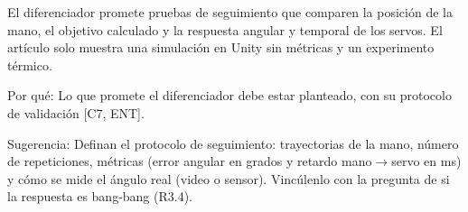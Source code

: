\documentclass{LabDSTresponse}
\begin{document}

{El diferenciador promete pruebas de seguimiento que comparen la posición de la mano, el objetivo calculado y la respuesta angular y temporal de los servos. El artículo solo muestra una simulación en Unity sin métricas y un experimento térmico.

Por qué: Lo que promete el diferenciador debe estar planteado, con su protocolo de validación [C7, ENT].

Sugerencia: Definan el protocolo de seguimiento: trayectorias de la mano, número de repeticiones, métricas (error angular en grados y retardo mano$\to$servo en ms) y cómo se mide el ángulo real (video o sensor). Vincúlenlo con la pregunta de si la respuesta es bang-bang (R3.4).}
\end{document}
